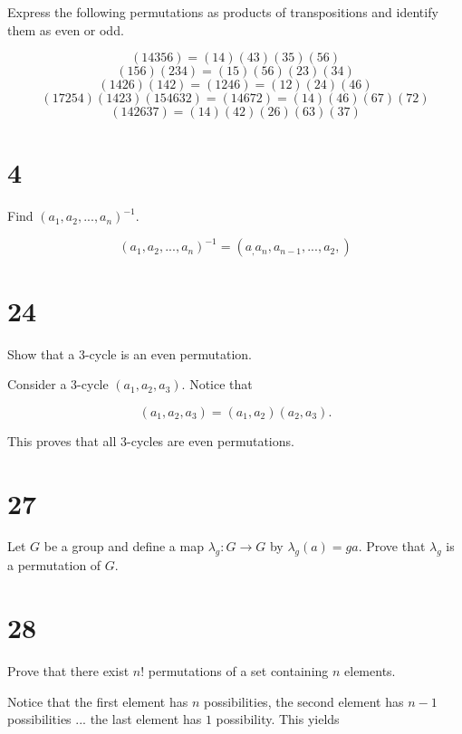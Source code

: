 \documentclass[a4paper]{article}
\begin{document}
Express the following permutations as products of transpositions and identify them as even or odd.

$$(14356) = (14)(43)(35)(56)$$
$$(156)(234) = (15)(56)(23)(34)$$
$$(1426)(142) = (1246) = (12)(24)(46)$$
$$(17254)(1423)(154632) = (14672) = (14)(46)(67)(72)$$
$$(142637) = (14)(42)(26)(63)(37)$$



\section*{4}

Find $(a_1, a_2, ..., a_n)^{-1}$.

$$(a_1, a_2, ..., a_n)^{-1} = (a_, a_n, a_{n-1}, ..., a_2,)$$

\section*{24}

Show that a 3-cycle is an even permutation.

\vspace{\baselineskip}

Consider a 3-cycle $(a_1, a_2, a_3)$. Notice that 

$$(a_1, a_2, a_3) = (a_1, a_2)(a_2, a_3).$$

This proves that all 3-cycles are even permutations.


\section*{27}

Let $G$ be a group and define a map $\lambda_g : G \rightarrow G$ by $\lambda_g(a) = ga$. Prove that $\lambda_g$ is a permutation of $G$.

\vspace{\baselineskip}




\section*{28}

Prove that there exist $n!$ permutations of a set containing $n$ elements.

\vspace{\baselineskip}

Notice that the first element has $n$ possibilities, the second element  has $n-1$ possibilities ... the last element has $1$ possibility. This yields
\end{document}
